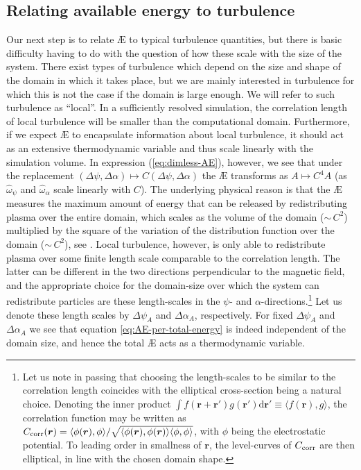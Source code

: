 \subsection{Relating available energy to turbulence}
Our next step is to relate \AE{} to typical turbulence quantities, but there is basic difficulty having to do with the question of how these scale with the size of the system. There exist types of turbulence which depend on the size and shape of the domain in which it takes place, but we are mainly interested in turbulence for which this is not the case if the domain is large enough. We will refer to such turbulence as ``local''. In a sufficiently resolved simulation, the correlation length of local turbulence will be smaller than the computational domain. Furthermore, if we expect \AE{} to encapsulate information about local turbulence, it should act as an extensive thermodynamic variable and thus scale linearly with the simulation volume. In expression (\ref{eq:dimless-AE}), however, we see that under the replacement $(\Delta \psi, \Delta \alpha) \mapsto C(\Delta \psi, \Delta \alpha)$ the \AE{} transforms as $A \mapsto C^4 A$ (as $\hat{\omega}_\psi$ and $\hat{\omega}_\alpha$ scale linearly with $C$). The underlying physical reason is that the \AE{} measures the maximum amount of energy that can be released by redistributing plasma over the entire domain, which scales as the volume of the domain (${\sim} \, C^2$) multiplied by the square of the variation of the distribution function over the domain (${\sim} \, C^2$), see \citet{Helander2017AvailablePlasmas}. Local turbulence, however, is only able to redistribute plasma over some finite length scale comparable to the correlation length. The latter can be different in the two directions perpendicular to the magnetic field, and the appropriate choice for the domain-size over which the system can redistribute particles are these length-scales in the $\psi$- and $\alpha$-directions.\footnote{Let us note in passing that choosing the length-scales to be similar to the correlation length coincides with the elliptical cross-section being a natural choice. Denoting the inner product $\int f(\boldsymbol{r}+\boldsymbol{r}') g(\boldsymbol{r}') \mathrm{d} \boldsymbol{r}' \equiv \langle f(\boldsymbol{r}), g \rangle$, the correlation function may be written as $C_{\rm corr}(\boldsymbol{r}) = \langle \phi(\boldsymbol{r}),\phi \rangle/\sqrt{\langle \phi(\boldsymbol{r}),\phi(\boldsymbol{r})\rangle \langle \phi,\phi \rangle}$, with $\phi$ being the electrostatic potential. To leading order in smallness of $\boldsymbol{r}$, the level-curves of $C_{\rm corr}$ are then elliptical, in line with the chosen domain shape.} Let us denote these length scales by $\Delta \psi_{A}$ and $\Delta \alpha_{A}$, respectively. For fixed $\Delta \psi_{A}$ and $\Delta \alpha_{A}$ we see that equation \eqref{eq:AE-per-total-energy} is indeed independent of the domain size, and hence the total \AE{} acts as a thermodynamic variable. 
